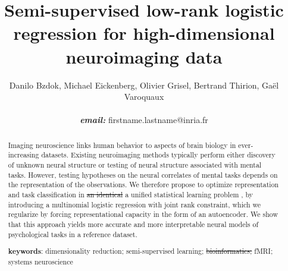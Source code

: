 \documentclass{article} %
\title{Semi-supervised low-rank logistic regression for
high-dimensional neuroimaging data}
\newcommand{\suggestadd}[1]{{\color{blue} #1}}
\newcommand{\suggestremove}[1]{{\color{red} \sout{#1}}}
\begin{document}
\author{Danilo Bzdok, Michael Eickenberg, Olivier Grisel,
  Bertrand Thirion,
  Ga\"el Varoquaux \\\\\textbf{\textit{email:} }firstname.lastname@inria.fr}

\maketitle

\begin{abstract}
Imaging neuroscience links human behavior to aspects of brain
biology in ever-increasing datasets.
%
Existing neuroimaging methods typically perform either discovery of unknown
neural structure or testing of neural structure associated with mental tasks.
%
However, testing hypotheses on the neural correlates of mental tasks
depends on the representation of the observations.
%
We therefore propose to optimize
representation and task classification in
\suggestremove{an identical} \suggestadd{a unified} statistical learning 
problem\suggestadd{, by introducing a multinomial logistic regression with
joint rank constraint, which we regularize by forcing representational
capacity in the form of an autoencoder}.
%
We show that this approach yields more accurate and more interpretable
neural models of psychological tasks in a reference dataset.
%

\textbf{keywords}: dimensionality reduction; semi-supervised learning;
\suggestremove{bioinformatics;} fMRI; systems neuroscience

\end{abstract}
\end{document}
